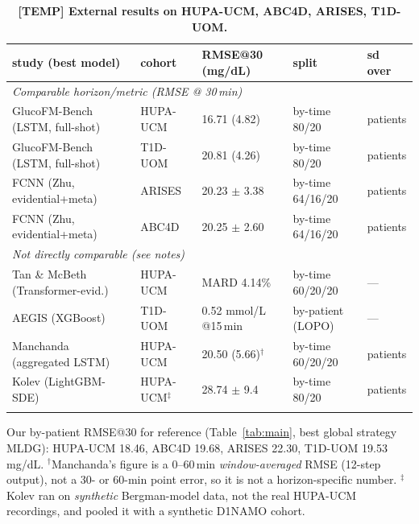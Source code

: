 \documentclass[10pt,letterpaper]{article}
\newlength\savedwidth
\newcommand\thickhline{\noalign{\global\savedwidth\arrayrulewidth\global\arrayrulewidth 2pt}%
\hline
\noalign{\global\arrayrulewidth\savedwidth}}
\begin{document}
\begin{table}[!ht]
\centering
\captionsetup{justification=centering,singlelinecheck=on}
\caption{\bf [TEMP] External results on HUPA-UCM, ABC4D, ARISES, T1D-UOM.}
\label{tab:prior}
\begin{tabular}{lllll}
\thickhline
study (best model) & cohort & RMSE@30 (mg/dL) & split & sd over \\
\hline
\multicolumn{5}{l}{\emph{Comparable horizon/metric (RMSE @ 30\,min)}} \\
GlucoFM-Bench (LSTM, full-shot) & HUPA-UCM & 16.71 (4.82) & by-time 80/20 & patients \\
GlucoFM-Bench (LSTM, full-shot) & T1D-UOM  & 20.81 (4.26) & by-time 80/20 & patients \\
FCNN (Zhu, evidential+meta)     & ARISES   & 20.23 $\pm$ 3.38 & by-time 64/16/20 & patients \\
FCNN (Zhu, evidential+meta)     & ABC4D    & 20.25 $\pm$ 2.60 & by-time 64/16/20 & patients \\
\hline
\multicolumn{5}{l}{\emph{Not directly comparable (see notes)}} \\
Tan \& McBeth (Transformer-evid.) & HUPA-UCM & MARD 4.14\% & by-time 60/20/20 & --- \\
AEGIS (XGBoost)                   & T1D-UOM  & 0.52 mmol/L @15\,min & by-patient (LOPO) & --- \\
Manchanda (aggregated LSTM)       & HUPA-UCM & 20.50 (5.66)$^\dagger$ & by-time 60/20/20 & patients \\
Kolev (LightGBM-SDE)              & HUPA-UCM$^\ddagger$ & 28.74 $\pm$ 9.4 & by-time 80/20 & patients \\
\thickhline
\end{tabular}
\begin{center}
{\small Our by-patient RMSE@30 for reference (Table~\ref{tab:main}, best global
strategy MLDG): HUPA-UCM 18.46, ABC4D 19.68, ARISES 22.30, T1D-UOM 19.53 mg/dL.
$^\dagger$Manchanda's figure is a 0--60\,min \emph{window-averaged} RMSE (12-step
output), not a 30- or 60-min point error, so it is not a horizon-specific number.
$^\ddagger$Kolev ran on \emph{synthetic} Bergman-model data, not the real
HUPA-UCM recordings, and pooled it with a synthetic D1NAMO cohort.}
\end{center}
\end{table}
\end{document}
